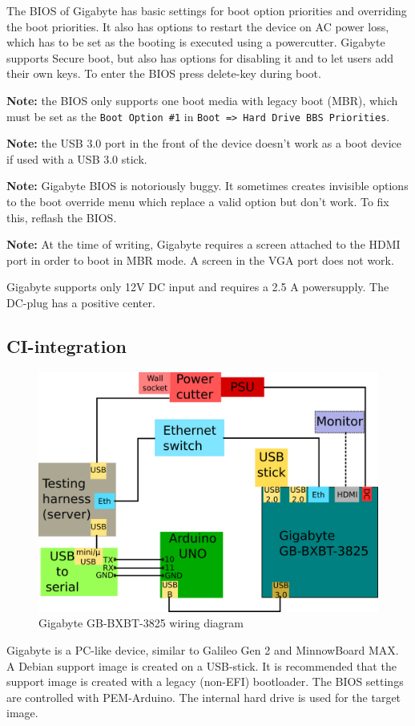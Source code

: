 \documentclass[a4paper,11pt]{article}
\newcommand{\note}{\textbf{Note: }}
\newcommand{\cmd}[1]{\texttt{#1}}
\begin{document}
The BIOS of Gigabyte has basic settings for boot option priorities and overriding the boot priorities. It also has options to restart the device on AC power loss, which has to be set as the booting is executed using a powercutter. Gigabyte supports Secure boot, but also has options for disabling it and to let users add their own keys. To enter the BIOS press delete-key during boot.

\note the BIOS only supports one boot media with legacy boot (MBR), which must be set as the \cmd{Boot Option \#1} in \cmd{Boot => Hard Drive BBS Priorities}.

\note the USB 3.0 port in the front of the device doesn't work as a boot device if used with a USB 3.0 stick.

\note Gigabyte BIOS is notoriously buggy. It sometimes creates invisible options to the boot override menu which replace a valid option but don't work. To fix this, reflash the BIOS.

\note At the time of writing, Gigabyte requires a screen attached to the HDMI port in order to boot in MBR mode. A screen in the VGA port does not work.

Gigabyte supports only 12V DC input and requires a 2.5 A powersupply. The DC-plug has a positive center.

\subsection{CI-integration}
\begin{figure}[h]
	\centering
	\includegraphics[width=0.7\linewidth]{gigabytewiring.png}
	\caption{Gigabyte GB-BXBT-3825 wiring diagram}
	\label{fig:gigabytewiring}
\end{figure}

Gigabyte is a PC-like device, similar to Galileo Gen 2 and MinnowBoard MAX. A Debian support image is created on a USB-stick. It is recommended that the support image is created with a legacy (non-EFI) bootloader. The BIOS settings are controlled with PEM-Arduino. The internal hard drive is used for the target image.
\end{document}
